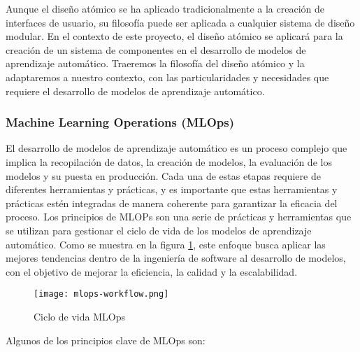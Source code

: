 Aunque el diseño atómico se ha aplicado tradicionalmente a la creación de interfaces
de usuario, su filosofía puede ser aplicada a cualquier sistema de diseño modular.
En el contexto de este proyecto, el diseño atómico se aplicará para la creación de un
sistema de componentes en el desarrollo de modelos de aprendizaje automático.
Traeremos la filosofía del diseño atómico y la adaptaremos a nuestro contexto,
con las particularidades y necesidades que requiere el desarrollo de modelos de
aprendizaje automático. 

\subsubsection{Machine Learning Operations (MLOps)}
El desarrollo de modelos de aprendizaje automático es un proceso complejo que implica
la recopilación de datos, la creación de modelos, la evaluación de los modelos y su
puesta en producción. Cada una de estas etapas requiere de diferentes herramientas y
prácticas, y es importante que estas herramientas y prácticas estén integradas de manera
coherente para garantizar la eficacia del proceso. Los principios de MLOPs son una serie de prácticas y herramientas que se utilizan
para gestionar el ciclo de vida de los modelos de aprendizaje automático. Como se muestra en la
figura \ref{fig:mlops-workflow}, este enfoque busca aplicar las mejores tendencias dentro de la 
ingeniería de software al desarrollo de modelos, con el objetivo de mejorar la eficiencia, la 
calidad y la escalabilidad.\medskip

\begin{figure}[ht]
    \centering
    \texttt{[image: mlops-workflow.png]}
    \caption{Ciclo de vida MLOps}\label{fig:mlops-workflow}
\end{figure}


Algunos de los principios clave de MLOps son:

